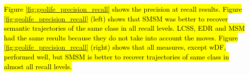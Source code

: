 \documentclass[12pt]{article}
\begin{document}
\hl{Figure {\ref{fig:geolife_precision_recall}} shows the precision at recall results. Figure {\ref{fig:geolife_precision_recall}} (left) shows that SMSM was better to recover semantic trajectories of the same class in all recall levels. LCSS, EDR and MSM had the same results because they do not take into account the moves. Figure {\ref{fig:geolife_precision_recall}} (right) shows that all measures, except wDF, performed well, but SMSM is better to recover trajectories of same class in almost all recall levels.}
\end{document}
